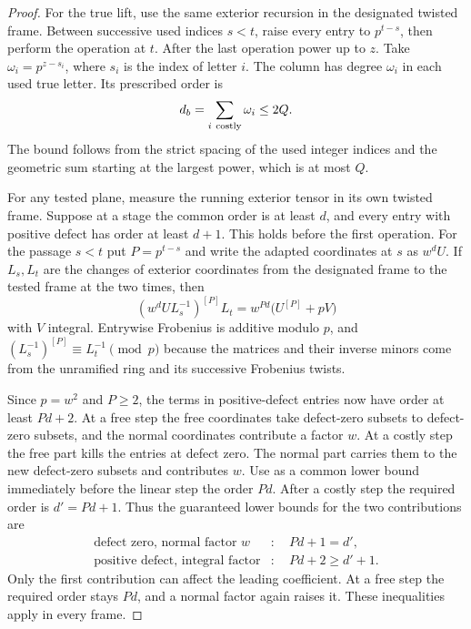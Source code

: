 \begin{proof}
For the true lift, use the same exterior recursion in the
designated twisted frame. Between successive used indices
\(s<t\), raise every entry to \(p^{t-s}\), then perform the
operation at \(t\). After the last operation power up to \(z\).
Take \(\omega_i=p^{z-s_i}\), where \(s_i\) is the index of
letter \(i\). The column has degree \(\omega_i\) in each used
true letter. Its prescribed order is
\[
             d_b=\sum_{i\ {\rm costly}}\omega_i\le 2Q .
\]
The bound follows from the strict spacing of the used integer
indices and the geometric sum starting at the largest power,
which is at most \(Q\).

For any tested plane, measure the running exterior tensor in
its own twisted frame. Suppose at a stage the common order is
at least \(d\), and every entry with positive defect has order
at least \(d+1\). This holds before the first operation.
For the passage \(s<t\) put \(P=p^{t-s}\) and write the
adapted coordinates at \(s\) as \(w^d U\). If \(L_s,L_t\)
are the changes of exterior coordinates from the designated
frame to the tested frame at the two times, then
\[
       (w^d U L_s^{-1})^{[P]} L_t
                 = w^{Pd}\big(U^{[P]}+pV\big)
\]
with \(V\) integral. Entrywise Frobenius is additive modulo
\(p\), and \((L_s^{-1})^{[P]}\equiv L_t^{-1}\pmod p\)
because the matrices and their inverse minors come from the
unramified ring and its successive Frobenius twists.

Since
\(p=w^2\) and \(P\ge2\), the terms in positive-defect entries
now have order at least \(Pd+2\). At a free step the free
coordinates take defect-zero subsets to defect-zero subsets,
and the normal coordinates contribute a factor \(w\).
At a costly step the free part kills the entries at defect
zero. The normal part carries them to the new defect-zero
subsets and contributes \(w\). Use as a common lower bound immediately before the linear step the order \(Pd\).
After a costly step the required order is \(d'=Pd+1\).
Thus the guaranteed lower bounds for the two contributions are
\[
 \begin{aligned}
 \text{defect zero, normal factor }w &: \quad Pd+1=d',\\
 \text{positive defect, integral factor} &: \quad Pd+2\ge d'+1 .
 \end{aligned}
\]
Only the first contribution can affect the leading coefficient.
At a free step the required order stays \(Pd\), and a normal
factor again raises it. These inequalities apply in every frame.


\end{proof}

